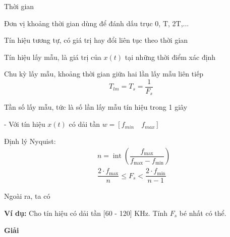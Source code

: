 \begin{list}{}{%
    \setlength{\leftmargin}{2.1cm}%
    \setlength{\labelwidth}{1.35cm}%
    \setlength{\labelsep}{0.25cm}%
    \setlength{\itemsep}{2pt}%
    \setlength{\parsep}{0pt}%
    \setlength{\topsep}{3pt}%
    \setlength{\partopsep}{0pt}%
    \setlength{\abovedisplayskip}{4pt}%
    \setlength{\belowdisplayskip}{4pt}%
    \setlength{\abovedisplayshortskip}{0pt}%
    \setlength{\belowdisplayshortskip}{4pt}%
    \renewcommand{\makelabel}[1]{\makebox[\labelwidth][l]{#1\hfill:}}%
}
    \item[$t$] Thời gian
    \item[$T$] Đơn vị khoảng thời gian dùng để đánh dấu trục 0, T, 2T,...
    \item[$x(t)$] Tín hiệu tương tự, có giá trị hay đổi liên tục theo thời gian
    \item[$x_{lm}(t)$] Tín hiệu lấy mẫu, là giá trị của $x(t)$ tại những thời điểm xác định
    \item[$T_{lm}$] Chu kỳ lấy mẫu, khoảng thời gian giữa hai lần lấy mẫu liên tiếp
    \[
        \boxed{T_{lm} = T_s = \dfrac{1}{F_s}}
    \]
    \item[$F_s$] Tần số lấy mẫu, tức là số lần lấy mẫu tín hiệu trong 1 giây
\end{list}

- Với tín hiệu $x(t)$ có dải tần $w = [f_{min} \quad f_{max}]$

\hspace*{1cm} Định lý Nyquist:
\[
    \begin{aligned}
        &\boxed{
            n = \operatorname{int}\left(\dfrac{f_{\max}}{f_{\max} - f_{\min}}\right)
        }\\[6pt]
        &\boxed{
            \dfrac{2 \cdot f_{\max}}{n} \leq F_s < \dfrac{2 \cdot f_{\min}}{n - 1}
        }
    \end{aligned}
\]

Ngoài ra, ta có


\noindent\textbf{Ví dụ:} Cho tín hiệu có dải tần [60 - 120] KHz. Tính $F_s$ bé nhất có thể.

\begin{center}
    \textbf{Giải}
\end{center}

